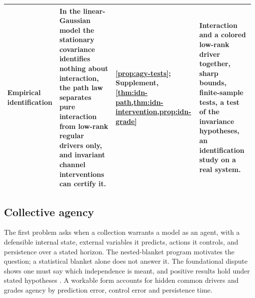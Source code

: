 \begin{table}[p]
\begin{tabular}{@{}>{\raggedright\arraybackslash}p{}>{\raggedright\arraybackslash}p{}>{\raggedright\arraybackslash}p{}>{\raggedright\arraybackslash}p{}@{}}
\addlinespace
Empirical identification & In the linear-Gaussian model the stationary covariance identifies nothing about interaction, the path law separates pure interaction from low-rank regular drivers only, and invariant channel interventions can certify it. & \cref{prop:agy-tests}; Supplement, \cref{thm:idn-path,thm:idn-intervention,prop:idn-grade} & Interaction and a colored low-rank driver together, sharp bounds, finite-sample tests, a test of the invariance hypotheses, an identification study on a real system. \\
\bottomrule
\end{tabular}
\end{table}

\subsection{Collective agency}\label{sec:opn-1}

The first problem asks when a collection warrants a model as an agent, with a defensible internal state, external variables it predicts, actions it controls, and persistence over a stated horizon. The nested-blanket program \citep{kirchhoff2018markov} motivates the question; a statistical blanket alone does not answer it. The foundational dispute \citep{biehl2021technical,aguilera2022particular,heins2022sparse} shows one must say which independence is meant, and positive results hold under stated hypotheses \citep{dacosta2021bayesian,friston2023path}. A workable form accounts for hidden common drivers and grades agency by prediction error, control error and persistence time.

